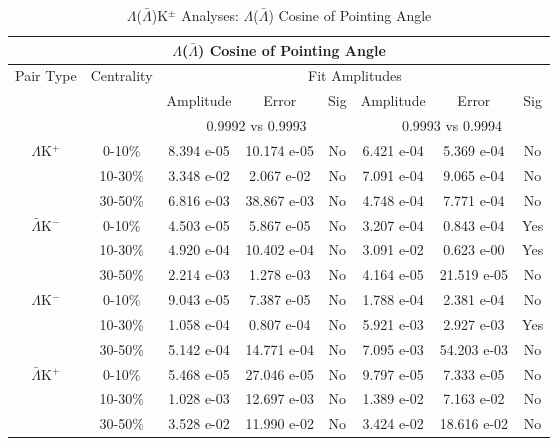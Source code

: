 \documentclass[../AnalysisNoteJBuxton.tex]{subfiles}
\begin{document}
\begin{table}
 \centering
 \begin{tabular}{|c|c|c|c|c||c|c|c|}
  \multicolumn{8}{c}{$\Lambda$($\bar{\Lambda}$) Cosine of Pointing Angle} \\
  \hline
  \multirow{3}{*}{Pair Type} & \multirow{3}{*}{Centrality} & \multicolumn{6}{c|}{Fit Amplitudes} \\
  \cline{3-8}
   & & Amplitude & Error & Sig & Amplitude & Error & Sig \\  
  \cline{3-8}
   & & \multicolumn{3}{c||}{0.9992 vs 0.9993} & \multicolumn{3}{c|}{0.9993 vs 0.9994} \\  
  \hline
  \multirow{3}{*}{$\Lambda$K$^{+}$}
   &  0-10\% & 8.394 e-05 & 10.174 e-05 & No & 6.421 e-04 & 5.369 e-04 & No \\
   & 10-30\% & 3.348 e-02 & 2.067 e-02 & No & 7.091 e-04 & 9.065 e-04 & No \\
   & 30-50\% & 6.816 e-03 & 38.867 e-03 & No & 4.748 e-04 & 7.771 e-04 & No \\
  \hline
  \multirow{3}{*}{$\bar{\Lambda}$K$^{-}$}
   &  0-10\% & 4.503 e-05 & 5.867 e-05 & No & 3.207 e-04 & 0.843 e-04 & Yes \\
   & 10-30\% & 4.920 e-04 & 10.402 e-04 & No & 3.091 e-02 & 0.623 e-00 & Yes \\
   & 30-50\% & 2.214 e-03 & 1.278 e-03 & No & 4.164 e-05 & 21.519 e-05 & No \\
  \hline \hline
  \multirow{3}{*}{$\Lambda$K$^{-}$}
   &  0-10\% & 9.043 e-05 & 7.387 e-05 & No & 1.788 e-04 & 2.381 e-04 & No \\
   & 10-30\% & 1.058 e-04 & 0.807 e-04 & No & 5.921 e-03 & 2.927 e-03 & Yes \\
   & 30-50\% & 5.142 e-04 & 14.771 e-04 & No & 7.095 e-03 & 54.203 e-03 & No \\
  \hline
  \multirow{3}{*}{$\bar{\Lambda}$K$^{+}$}
   &  0-10\% & 5.468 e-05 & 27.046 e-05 & No & 9.797 e-05 & 7.333 e-05 & No \\
   & 10-30\% & 1.028 e-03 & 12.697 e-03 & No & 1.389 e-02 & 7.163 e-02 & No \\
   & 30-50\% & 3.528 e-02 & 11.990 e-02 & No & 3.424 e-02 & 18.616 e-02 & No \\
  \hline
 \end{tabular}
 \caption{$\Lambda$($\bar{\Lambda}$)K$^{\pm}$ Analyses: $\Lambda$($\bar{\Lambda}$) Cosine of Pointing Angle}
 \label{tab:LamCosPointingAngleLamKch}
\end{table}
\end{document}
